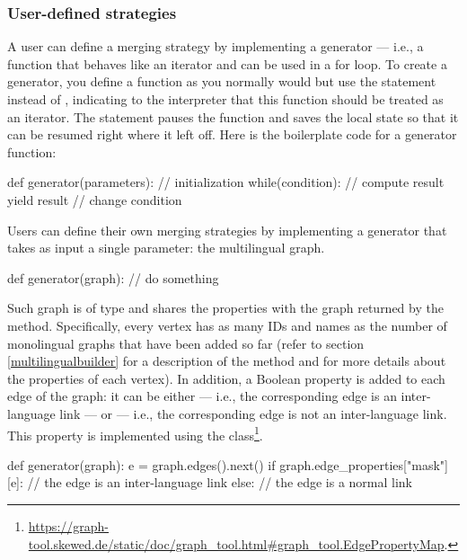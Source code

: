             \subsubsection{User-defined strategies}\label{userdefined_strategies}
                A user can define a merging strategy by implementing a generator --- i.e., a function that behaves like an iterator and can be used in a for loop. To create a generator, you define a function as you normally would but use the  statement instead of , indicating to the interpreter that this function should be treated as an iterator. The  statement pauses the function and saves the local state so that it can be resumed right where it left off. Here is the boilerplate code for a generator function:
                \begin{example}
def generator(parameters):
    // initialization
    while(condition):
        // compute result
        yield result
        // change condition
                \end{example}
                
                Users can define their own merging strategies by implementing a generator that takes as input a single parameter: the multilingual graph.
                \begin{example}
def generator(graph):
    // do something
                \end{example}
                Such graph is of type  and shares the properties with the graph returned by the  method. Specifically, every vertex has as many IDs and names as the number of monolingual graphs that have been added so far (refer to section \ref{multilingualbuilder} for a description of the  method and for more details about the properties of each vertex). In addition, a Boolean  property is added to each edge of the graph: it can be either  --- i.e., the corresponding edge is an inter-language link --- or  --- i.e., the corresponding edge is not an inter-language link. This property is implemented using the  class\footnote{\url{https://graph-tool.skewed.de/static/doc/graph_tool.html\#graph_tool.EdgePropertyMap}.}.
                \begin{example}
def generator(graph):
    e = graph.edges().next()
    if graph.edge_properties["mask"][e]:
        // the edge is an inter-language link
    else:
        // the edge is a normal link
                \end{example}
                
